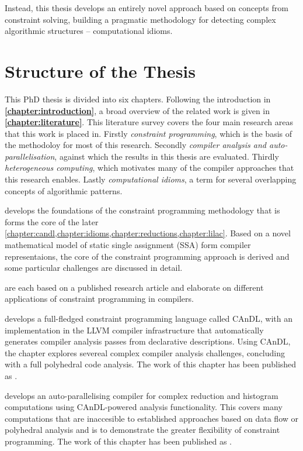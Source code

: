     Instead, this thesis develops an entirely novel approach based on concepts
    from constraint solving, building a pragmatic methodology for detecting
    complex algorithmic structures -- computational idioms.

\pagebreak
\section{Structure of the Thesis}

    This PhD thesis is divided into six chapters.
    Following the introduction in {\bf\cref{chapter:introduction}}, a broad
    overview of the related work is given in {\bf\cref{chapter:literature}}.
    This literature survey covers the four main research areas that this work
    is placed in.
    Firstly {\em constraint programming}, which is the basis of the methodoloy
    for most of this research.
    Secondly {\em compiler analysis and auto-parallelisation}, against which the
    results in this thesis are evaluated.
    Thirdly {\em heterogeneous computing}, which motivates many of the compiler
    approaches that this research enables.
    Lastly {\em computational idioms}, a term for several overlapping concepts
    of algorithmic patterns.

    {\bf{}} develops the foundations of the constraint
    programming methodology that is forms the core of the later
    \cref{chapter:candl,chapter:idioms,chapter:reductions,chapter:lilac}.
    Based on a novel mathematical model of static single assignment (SSA) form
    compiler representaions, the core of the constraint programming approach
    is derived and some particular challenges are discussed in detail.

    {\bf{}}
    are each based on a published research article and elaborate on different
    applications of constraint programming in compilers.

    {\bf{}} develops a full-fledged constraint programming
    language called CAnDL, with an implementation in the LLVM compiler
    infrastructure that automatically generates compiler analysis passes from
    declarative descriptions.
    Using CAnDL, the chapter explores severeal complex compiler analysis
    challenges, concluding with a full polyhedral code analysis.
    The work of this chapter has been published as
    {\bf\citet{Ginsbach:2018:CDS:3178372.3179515}}.

    {\bf{}} develops an auto-parallelising compiler for
    complex reduction and histogram computations using CAnDL-powered analysis
    functionality.
    This covers many computations that are inaccesible to established approaches
    based on data flow or polyhedral analysis and is to demonstrate the greater
    flexibility of constraint programming.
    The work of this chapter has been published as
    {\bf\citet{ginsbach2017discovery}}.

